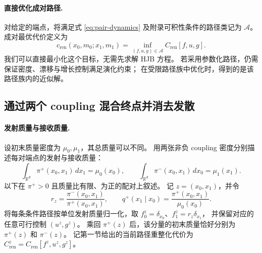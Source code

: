 \documentclass[UTF8,a4paper,11pt,fontset=fandol]{ctexart}
\begin{document}
\paragraph{直接优化成对路径.}
对给定的端点，将满足式 \eqref{eq:pair-dynamics}
及附录可积性条件的路径类记为 $\mathcal A$。成对最优代价定义为
\begin{equation}
c_{\mathrm{ren}}(x_0,m_0;x_1,m_1)
=\inf_{(f,u,g)\in\mathcal A}
C_{\mathrm{ren}}[f,u,g].
\label{eq:pair-optimization}
\end{equation}
我们可以直接最小化这个目标，无需先求解 HJB 方程。
若采用参数化路径，仍需保证密度、漂移与增长控制满足演化约束；
在受限路径族中优化时，得到的是该路径族内的近似解。

\clearpage
\subsection*{通过两个 coupling 混合终点并消去发散}

\paragraph{发射质量与接收质量.}
设初末质量密度为 $\mu_0,\mu_1$，其总质量可以不同。
用两张非负 coupling 密度分别描述每对端点的发射与接收质量：
\begin{equation}
\int_{\mathbb R^d}\pi^+(x_0,x_1)\,dx_1=\mu_0(x_0),
\qquad
\int_{\mathbb R^d}\pi^-(x_0,x_1)\,dx_0=\mu_1(x_1).
\label{eq:semicoupling-constraints}
\end{equation}
以下在 $\pi^+>0$ 且质量比有限、为正的配对上叙述。
记 $z=(x_0,x_1)$，并令
\begin{equation}
r_z=\frac{\pi^-(x_0,x_1)}{\pi^+(x_0,x_1)},
\qquad
q^+(x_1\mid x_0)=\frac{\pi^+(x_0,x_1)}{\mu_0(x_0)}.
\label{eq:pair-ratio}
\end{equation}
将每条条件路径按单位发射质量归一化，取
$f_0^z=\delta_{x_0}$、$f_1^z=r_z\delta_{x_1}$，
并保留对应的任意可行控制 $(u^z,g^z)$。
乘回 $\pi^+(z)$ 后，该分量的初末质量恰好分别为 $\pi^+(z)$ 和 $\pi^-(z)$。
记第一节给出的当前路径重整化代价为
$C_{\mathrm{ren}}^z=C_{\mathrm{ren}}[f^z,u^z,g^z]$。
\end{document}

